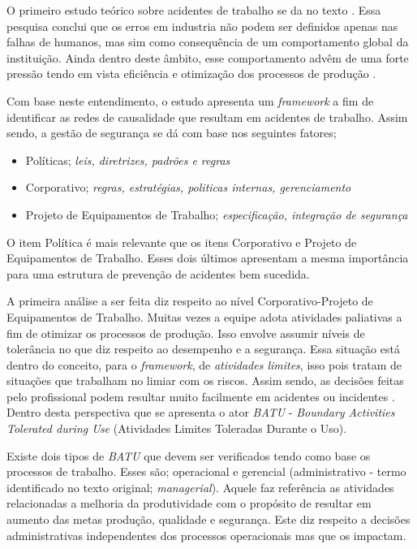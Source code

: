 O primeiro estudo teórico sobre acidentes de trabalho se da no texto \cite{riskoldschool}. Essa pesquisa conclui que os erros em industria não podem ser definidos apenas nas falhas de 
humanos, mas sim como consequência de um comportamento global da instituição. Ainda dentro deste âmbito, esse comportamento advêm de uma forte pressão tendo em vista eficiência e otimização dos processos de produção \cite{riskoldschool} \cite{safety}.

Com base neste entendimento, o estudo \cite{safety} apresenta um \textit{framework} a fim de identificar as redes de causalidade que resultam em acidentes de trabalho. Assim sendo, a gestão de 
segurança se dá com base nos seguintes fatores; 
\begin{itemize}
    \item Políticas; \textit{leis, diretrizes, padrões e regras}
    \item Corporativo; \textit{regras, estratégias, politicas internas, gerenciamento}
    \item Projeto de Equipamentos de Trabalho; \textit{especificação, integração de segurança}
\end{itemize}

O item Política é mais relevante que os itens Corporativo e Projeto de Equipamentos de Trabalho. Esses dois últimos apresentam a mesma importância para uma estrutura de prevenção de acidentes 
bem sucedida. 

A primeira análise a ser feita diz respeito ao nível Corporativo-Projeto de Equipamentos de Trabalho. Muitas vezes a equipe adota atividades paliativas a fim de otimizar os processos de produção. Isso envolve assumir níveis de tolerância no que diz respeito ao desempenho e a segurança. Essa situação está dentro do conceito, para o \textit{framework}, de \textit{atividades
limites}, isso pois tratam de situações que trabalham no limiar com os riscos. Assim sendo, as decisões feitas pelo profissional podem resultar muito facilmente em acidentes ou incidentes \cite{safety}. 
Dentro desta perspectiva que se apresenta o ator \textit{BATU} - \textit{Boundary Activities Tolerated during Use} (Atividades Limites Toleradas Durante o Uso).

Existe dois tipos de \textit{BATU} que devem ser verificados tendo como base os processos de trabalho. Esses são; operacional e gerencial (administrativo - termo identificado no texto original; \textit{managerial}). Aquele faz referência as atividades relacionadas a melhoria da produtividade com o propósito de resultar em aumento das metas produção, qualidade e segurança. Este diz respeito a decisões administrativas independentes dos processos operacionais mas que os impactam.

